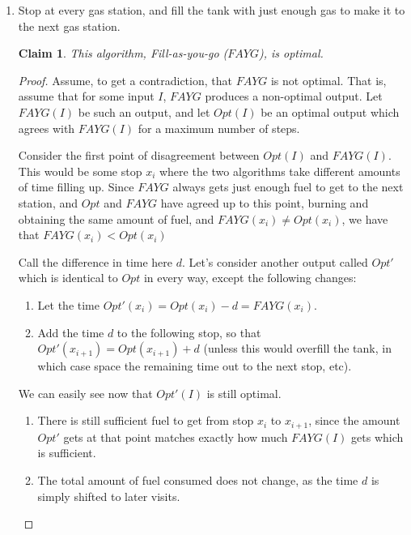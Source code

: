 \documentclass{article}
\newtheorem{thm}{Claim}
\begin{document}
    \begin{enumerate}[label=(\alph*)]
        \item Stop at every gas station, and fill the tank with just enough gas to make it to the next gas station.
        
        \begin{thm}
            This algorithm, Fill-as-you-go ($FAYG$), is optimal.
        \end{thm}
        \begin{proof}
            Assume, to get a contradiction, that $FAYG$ is not optimal.
            That is, assume that for some input $I$, $FAYG$ produces a non-optimal output.
            Let $FAYG(I)$ be such an output, and let $Opt(I)$ be an optimal output which agrees with $FAYG(I)$ for a maximum number of steps.
            
            Consider the first point of disagreement between $Opt(I)$ and $FAYG(I)$.
            This would be some stop $x_i$ where the two algorithms take different amounts of time filling up.
            Since $FAYG$ always gets just enough fuel to get to the next station, and $Opt$ and $FAYG$ have agreed up to this point, burning and obtaining the same amount of fuel, and $FAYG(x_i) \ne Opt(x_i)$, we have that $FAYG(x_i) < Opt(x_i)$
            
            Call the difference in time here $d$.
            Let's consider another output called $Opt'$ which is identical to $Opt$ in every way, except the following changes:
            
            \begin{enumerate}[label=\arabic*.]
                \item Let the time $Opt'(x_i) = Opt(x_i) - d = FAYG(x_i)$.
                \item Add the time $d$ to the following stop, so that $Opt'(x_{i+1}) = Opt(x_{i+1}) + d$ (unless this would overfill the tank, in which case space the remaining time out to the next stop, etc).
            \end{enumerate}
            
            We can easily see now that $Opt'(I)$ is still optimal.
            \begin{enumerate}[label=\arabic*.]
                \item There is still sufficient fuel to get from stop $x_i$ to $x_{i+1}$, since the amount $Opt'$ gets at that point matches exactly how much $FAYG(I)$ gets which is sufficient.
                \item The total amount of fuel consumed does not change, as the time $d$ is simply shifted to later visits.
            \end{enumerate}
            

\end{proof}
\end{enumerate}
\end{document}
